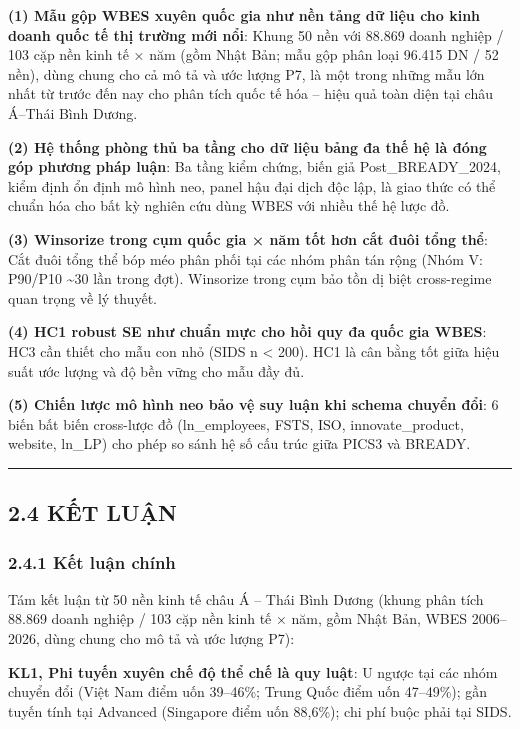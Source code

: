 \documentclass[
  a4paper,
  13pt]{extreport}
\begin{document}
\textbf{(1) Mẫu gộp WBES xuyên quốc gia như nền tảng dữ liệu cho kinh
doanh quốc tế thị trường mới nổi}: Khung 50 nền với 88.869 doanh nghiệp
/ 103 cặp nền kinh tế × năm (gồm Nhật Bản; mẫu gộp phân loại 96.415 DN /
52 nền), dùng chung cho cả mô tả và ước lượng P7, là một trong những mẫu
lớn nhất từ trước đến nay cho phân tích quốc tế hóa -- hiệu quả toàn
diện tại châu Á--Thái Bình Dương.

\textbf{(2) Hệ thống phòng thủ ba tầng cho dữ liệu bảng đa thế hệ là
đóng góp phương pháp luận}: Ba tầng kiểm chứng, biến giả
Post\_BREADY\_2024, kiểm định ổn định mô hình neo, panel hậu đại dịch
độc lập, là giao thức có thể chuẩn hóa cho bất kỳ nghiên cứu dùng WBES
với nhiều thế hệ lược đồ.

\textbf{(3) Winsorize trong cụm quốc gia × năm tốt hơn cắt đuôi tổng
thể}: Cắt đuôi tổng thể bóp méo phân phối tại các nhóm phân tán rộng
(Nhóm V: P90/P10 \textasciitilde30 lần trong đợt). Winsorize trong cụm
bảo tồn dị biệt cross-regime quan trọng về lý thuyết.

\textbf{(4) HC1 robust SE như chuẩn mực cho hồi quy đa quốc gia WBES}:
HC3 cần thiết cho mẫu con nhỏ (SIDS n \textless{} 200). HC1 là cân bằng
tốt giữa hiệu suất ước lượng và độ bền vững cho mẫu đầy đủ.

\textbf{(5) Chiến lược mô hình neo bảo vệ suy luận khi schema chuyển
đổi}: 6 biến bất biến cross-lược đồ (ln\_employees, FSTS, ISO,
innovate\_product, website, ln\_LP) cho phép so sánh hệ số cấu trúc giữa
PICS3 và BREADY.

\begin{center}\rule{0.5\linewidth}{0.5pt}\end{center}

\hypertarget{kux1ebft-luux1eadn}{%
\subsection{2.4 KẾT LUẬN}\label{kux1ebft-luux1eadn}}

\hypertarget{kux1ebft-luux1eadn-chuxednh}{%
\subsubsection{2.4.1 Kết luận chính}\label{kux1ebft-luux1eadn-chuxednh}}

Tám kết luận từ 50 nền kinh tế châu Á -- Thái Bình Dương (khung phân
tích 88.869 doanh nghiệp / 103 cặp nền kinh tế × năm, gồm Nhật Bản, WBES
2006--2026, dùng chung cho mô tả và ước lượng P7):

\textbf{KL1, Phi tuyến xuyên chế độ thể chế là quy luật}: U ngược tại
các nhóm chuyển đổi (Việt Nam điểm uốn 39--46\%; Trung Quốc điểm uốn
47--49\%); gần tuyến tính tại Advanced (Singapore điểm uốn 88,6\%); chi
phí buộc phải tại SIDS.
\end{document}
